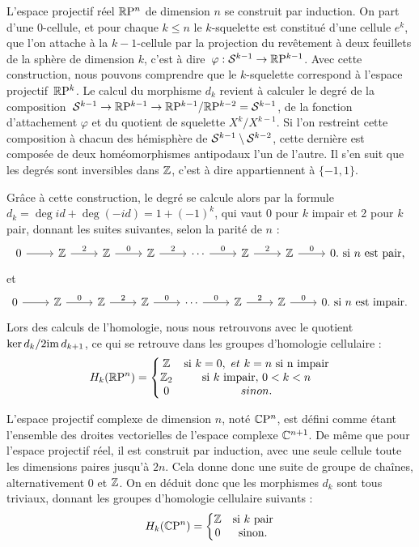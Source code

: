 \begin{exemple}
L'espace projectif réel $\mathbb{R}\mathrm{P}^n$ de dimension $n$ se construit par induction. On part d'une 0-cellule, et pour chaque $k\leq n$ le $k$-squelette est constitué d'une cellule $e^k$, que l'on attache à la $k-1$-cellule par la projection du revêtement à deux feuillets de la sphère de dimension $k$, c'est à dire~${\varphi:\mathcal{S}^{k-1}\to\mathbb{R}\mathrm{P}^{k-1}}$. Avec cette construction, nous pouvons comprendre que le $k$-squelette correspond à l'espace projectif~$\mathbb{R}\mathrm{P}^k$. Le calcul du morphisme $d_k$ revient à calculer le degré de la composition~${\mathcal{S}^{k-1}\to \mathbb{R}\mathrm{P}^{k-1}\to\mathbb{R}\mathrm{P}^{k-1}/\mathbb{R}\mathrm{P}^{k-2}=\mathcal{S}^{k-1}}$, de la fonction d'attachement $\varphi$ et du quotient de squelette $X^k/X^{k-1}$. Si l'on restreint cette composition à chacun des hémisphère de $\mathcal{S}^{k-1}\setminus\mathcal{S}^{k-2}$, cette dernière est composée de deux homéomorphismes antipodaux l'un de l'autre. Il s'en suit que les degrés sont inversibles dans $\mathbb{Z}$, c'est à dire appartiennent à $\{-1,1\}$.

Grâce à cette construction, le degré se calcule alors par la formule ${d_k=\deg id+\deg (-id)=1+(-1)^k}$, qui vaut 0 pour $k$ impair et 2 pour $k$ pair, donnant les suites suivantes, selon la parité de $n$ : \[\begin{tikzcd}
    0\arrow[r]&\bb{Z}\arrow[r,"2"]&\bb{Z}\arrow[r,"0"]&\bb{Z}\arrow[r,"2"]&\cdots\arrow[r,"0"]&\bb{Z}\arrow[r,"2"]&\bb{Z}\arrow[r,"0"]&0.\text{ si $n$ est pair,}
\end{tikzcd}\]
et
\[\begin{tikzcd}
    0\arrow[r]&\bb{Z}\arrow[r,"0"]&\bb{Z}\arrow[r,"2"]&\bb{Z}\arrow[r,"0"]&\cdots\arrow[r,"0"]&\bb{Z}\arrow[r,"2"]&\bb{Z}\arrow[r,"0"]&0.\text{ si $n$ est impair.}
\end{tikzcd}\]Lors des calculs de l'homologie, nous nous retrouvons avec le quotient $\ker d_k/2\mathrm{im}\, d_{k+1}$, ce qui se retrouve dans les groupes d'homologie cellulaire : \[H_k(\mathbb{R}\mathrm{P}^n)=\left\{\begin{matrix}
\mathbb{Z}&\text{si}\ k=0,\ et\ k=n\text{ si n impair}\\
\mathbb{Z}_2&\text{si}\  k\ \text{impair},\,0<k<n\\
0&sinon.
\end{matrix}\right.\]
\end{exemple}

\begin{exemple}
L'espace projectif complexe de dimension $n$, noté $\mathbb{C}\mathrm{P}^n$, est défini comme étant l'ensemble des droites vectorielles de l'espace complexe $\mathbb{C}^{n+1}$. De même que pour l'espace projectif réel, il est construit par induction, avec une seule cellule toute les dimensions paires jusqu'à $2n$. Cela donne donc une suite de groupe de chaînes, alternativement 0 et $\mathbb{Z}$. On en déduit donc que les morphismes $d_k$ sont tous triviaux, donnant les groupes d'homologie cellulaire suivants : \[H_k(\mathbb{C}\mathrm{P}^n)=\left\{\begin{matrix}
\mathbb{Z}&\text{si}\ k\ \text{pair}\\
0&\text{sinon}.
\end{matrix}\right.\]
\end{exemple}


